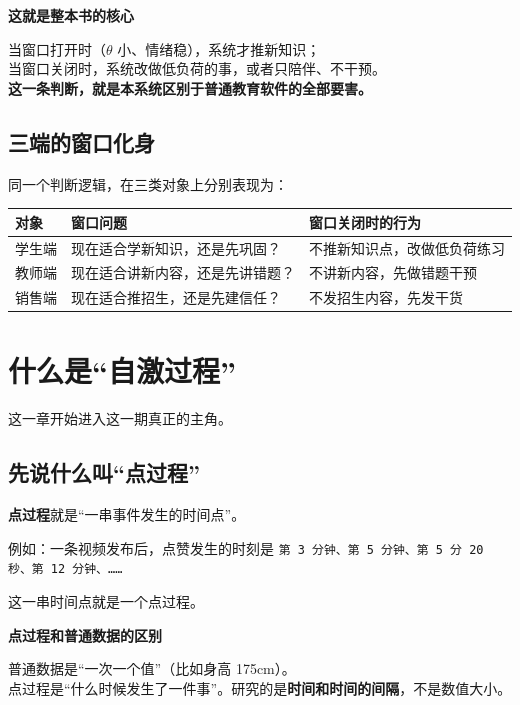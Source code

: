 \documentclass[UTF8,a4paper,11pt]{ctexart}
\newenvironment{explainbox}[1]
{\begin{center}\begin{minipage}{0.94\textwidth}\colorbox{boxbg}{\parbox{0.92\textwidth}{\textbf{#1}\par\vspace{2pt}}}}
{\end{minipage}\end{center}}
\newcommand{\term}[1]{\textbf{#1}}
\newcommand{\hl}[1]{\textcolor{blue!70!black}{\textbf{#1}}}
\begin{document}
\begin{explainbox}{这就是整本书的核心}
当窗口打开时（$\theta$ 小、情绪稳），系统才推新知识；\\
当窗口关闭时，系统改做低负荷的事，或者只陪伴、不干预。\\
\hl{这一条判断，就是本系统区别于普通教育软件的全部要害。}
\end{explainbox}

\subsection{三端的窗口化身}

同一个判断逻辑，在三类对象上分别表现为：

\begin{center}
\begin{tabular}{p{2.1cm}p{4.6cm}p{6.0cm}}
\toprule
\textbf{对象} & \textbf{窗口问题} & \textbf{窗口关闭时的行为} \\
\midrule
学生端 & 现在适合学新知识，还是先巩固？ & 不推新知识点，改做低负荷练习 \\
教师端 & 现在适合讲新内容，还是先讲错题？ & 不讲新内容，先做错题干预 \\
销售端 & 现在适合推招生，还是先建信任？ & 不发招生内容，先发干货 \\
\bottomrule
\end{tabular}
\end{center}

\newpage


\section{什么是“自激过程”}

这一章开始进入这一期真正的主角。

\subsection{先说什么叫“点过程”}

\term{点过程}就是“一串事件发生的时间点”。

例如：一条视频发布后，点赞发生的时刻是
\texttt{第 3 分钟、第 5 分钟、第 5 分 20 秒、第 12 分钟、……}

这一串时间点就是一个点过程。

\begin{explainbox}{点过程和普通数据的区别}
普通数据是“一次一个值”（比如身高 175cm）。\\
点过程是“什么时候发生了一件事”。研究的是\textbf{时间和时间的间隔}，不是数值大小。
\end{explainbox}
\end{document}
